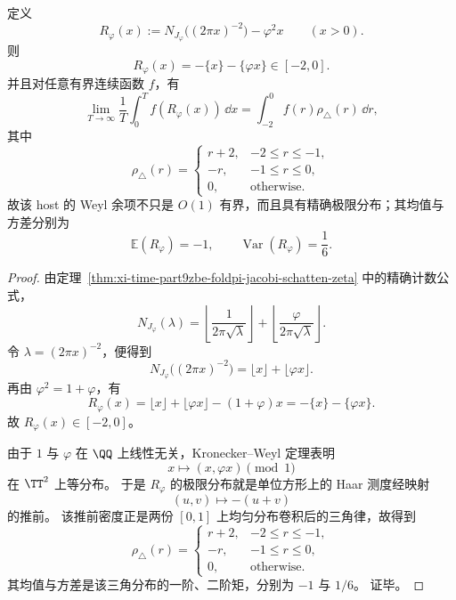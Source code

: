 \begin{theorem}\label{thm:xi-time-part9zbj-weyl-triangular-fluctuation}
定义
\[
R_\varphi(x)
:=
N_{J_\varphi}\!\bigl((2\pi x)^{-2}\bigr)-\varphi^2 x
\qquad (x>0).
\]
则
\[
R_\varphi(x)=-\{x\}-\{\varphi x\}\in [-2,0].
\]
并且对任意有界连续函数 \(f\)，有
\[
\lim_{T\to\infty}\frac{1}{T}\int_0^T f(R_\varphi(x))\,\dd x
=
\int_{-2}^{0}f(r)\rho_\triangle(r)\,\dd r,
\]
其中
\[
\rho_\triangle(r)=
\begin{cases}
r+2,& -2\le r\le -1,\\[1mm]
-r,& -1\le r\le 0,\\[1mm]
0,& \text{otherwise}.
\end{cases}
\]
故该 host 的 Weyl 余项不只是 \(O(1)\) 有界，而且具有精确极限分布；其均值与方差分别为
\[
\mathbb E(R_\varphi)=-1,
\qquad
\operatorname{Var}(R_\varphi)=\frac16.
\]
\end{theorem}
\begin{proof}
由定理~\ref{thm:xi-time-part9zbe-foldpi-jacobi-schatten-zeta} 中的精确计数公式，
\[
N_{J_\varphi}(\lambda)
=
\left\lfloor\frac{1}{2\pi\sqrt\lambda}\right\rfloor
+
\left\lfloor\frac{\varphi}{2\pi\sqrt\lambda}\right\rfloor.
\]
令 \(\lambda=(2\pi x)^{-2}\)，便得到
\[
N_{J_\varphi}\!\bigl((2\pi x)^{-2}\bigr)
=
\lfloor x\rfloor+\lfloor \varphi x\rfloor.
\]
再由 \(\varphi^2=1+\varphi\)，有
\[
R_\varphi(x)
=
\lfloor x\rfloor+\lfloor \varphi x\rfloor-(1+\varphi)x
=
-\{x\}-\{\varphi x\}.
\]
故 \(R_\varphi(x)\in[-2,0]\)。

由于 \(1\) 与 \(\varphi\) 在 \(\QQ\) 上线性无关，Kronecker--Weyl 定理表明
\[
x\longmapsto (x,\varphi x)\pmod 1
\]
在 \(\TT^2\) 上等分布。
于是 \(R_\varphi\) 的极限分布就是单位方形上的 Haar 测度经映射
\[
(u,v)\longmapsto -(u+v)
\]
的推前。
该推前密度正是两份 \([0,1]\) 上均匀分布卷积后的三角律，故得到
\[
\rho_\triangle(r)=
\begin{cases}
r+2,& -2\le r\le -1,\\[1mm]
-r,& -1\le r\le 0,\\[1mm]
0,& \text{otherwise}.
\end{cases}
\]
其均值与方差是该三角分布的一阶、二阶矩，分别为 \(-1\) 与 \(1/6\)。
证毕。
\end{proof}

